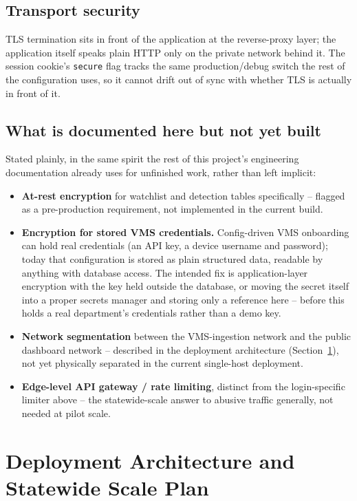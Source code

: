 \documentclass[11pt,a4paper]{article}
\begin{document}
\subsection{Transport security}

TLS termination sits in front of the application at the reverse-proxy
layer; the application itself speaks plain HTTP only on the private network
behind it. The session cookie's \texttt{secure} flag tracks the same
production/debug switch the rest of the configuration uses, so it cannot
drift out of sync with whether TLS is actually in front of it.

\subsection{What is documented here but not yet built}

Stated plainly, in the same spirit the rest of this project's engineering
documentation already uses for unfinished work, rather than left implicit:

\begin{itemize}
\item \textbf{At-rest encryption} for watchlist and detection tables
  specifically -- flagged as a pre-production requirement, not implemented
  in the current build.
\item \textbf{Encryption for stored VMS credentials.} Config-driven VMS
  onboarding can hold real credentials (an API key, a device username and
  password); today that configuration is stored as plain structured data,
  readable by anything with database access. The intended fix is
  application-layer encryption with the key held outside the database, or
  moving the secret itself into a proper secrets manager and storing only a
  reference here -- before this holds a real department's credentials
  rather than a demo key.
\item \textbf{Network segmentation} between the VMS-ingestion network and
  the public dashboard network -- described in the deployment architecture
  (Section~\ref{sec:scale}), not yet physically separated in the current
  single-host deployment.
\item \textbf{Edge-level API gateway / rate limiting}, distinct from the
  login-specific limiter above -- the statewide-scale answer to abusive
  traffic generally, not needed at pilot scale.
\end{itemize}

\section{Deployment Architecture and Statewide Scale Plan}
\label{sec:scale}
\end{document}
